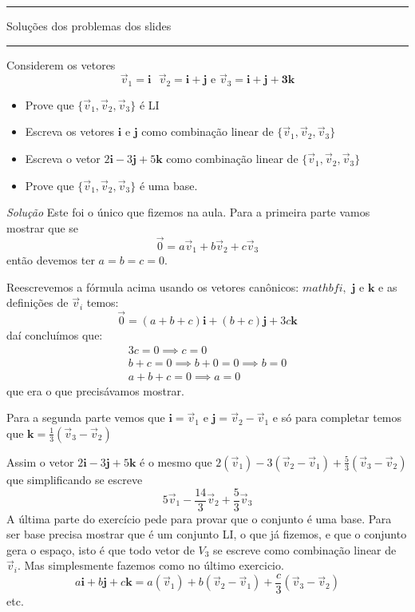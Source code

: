 \documentclass[12pt]{article}
\newcounter{questao}
\newcommand{\quest}{\stepcounter{questao}{\bf \arabic{questao}.\ }}
\begin{document}
\hrule
 {  \sf Soluções dos problemas dos slides   \hfill \fbox{}}
\hrule

\vspace{0.5cm}

\thispagestyle{empty}
\fontsize{14}{16}\selectfont

\quest  Considerem os vetores 
$$ \vec{v}_1=\mathbf{i} \text{  }  \vec{v}_2=\mathbf{i} + \mathbf{j} \text{ e }\vec{v}_3 = \mathbf{i + j + 3k} $$

\begin{itemize}
    \item Prove que $\{ \vec{v}_1,\vec{v}_2,\vec{v}_3\}$ é LI
    \item Escreva os vetores $\mathbf{i}$ e $\mathbf{j}$ como combinação linear de $\{ \vec{v}_1,\vec{v}_2,\vec{v}_3\}$
    \item Escreva o vetor $2\mathbf{i} -3\mathbf{j} + 5\mathbf{k}$ como combinação linear de $\{ \vec{v}_1,\vec{v}_2,\vec{v}_3\}$
    \item Prove que $\{ \vec{v}_1,\vec{v}_2,\vec{v}_3\}$ é uma base.
\end{itemize}

\textit{Solução} Este foi o único que fizemos na aula. Para a primeira parte vamos mostrar que se 
$$ \vec{0} = a\vec{v}_1 + b\vec{v}_2 + c\vec{v}_3$$ então devemos ter $a=b=c=0$.

Reescrevemos a fórmula acima usando os vetores canônicos:
$mathbf{i},$ $\mathbf{j}$ e $\mathbf{k}$ e as definições de $\vec{v}_i$ temos:
$$\vec{0} = (a+b+c)\mathbf{i} + (b+c)\mathbf{j} + 3c\mathbf{k} $$
daí concluímos que:
\begin{gather*}
3c = 0 \implies c =0 \\
b+c =0 \implies b+ 0 =0 \implies b=0\\
a+b+c=0 \implies a=0
\end{gather*}
que era o que precisávamos mostrar.

Para a segunda parte vemos que $\mathbf{i} =\vec{v}_1$
e $\mathbf{j} = \vec{v}_2 - \vec{v}_1$ e só para completar temos que $\mathbf{k}=\frac{1}{3}(\vec{v}_3 - \vec{v}_2)$

Assim o vetor  $2\mathbf{i} -3\mathbf{j} + 5\mathbf{k}$ é o mesmo que 
$2(\vec{v}_1) -3(\vec{v}_2 - \vec{v}_1) + \frac{5}{3}(\vec{v}_3 - \vec{v}_2)$ que simplificando se escreve
$$5\vec{v}_1 -\frac{14}{3}\vec{v}_2 + \frac{5}{3}\vec{v}_3 $$
A última parte do exercício pede para provar que o conjunto é uma base. Para ser base precisa mostrar que é um conjunto LI, o que já fizemos, e que o conjunto gera o espaço, isto é que todo vetor de $V_3$ se escreve como combinação linear
de $\vec{v}_i$. Mas simplesmente fazemos como no último exercicio.
$$ a\mathbf{i} + b\mathbf{j} + c\mathbf{k} =a(\vec{v}_1) +b(\vec{v}_2 - \vec{v}_1) + \frac{c}{3}(\vec{v}_3 - \vec{v}_2)$$ etc.
\end{document}
